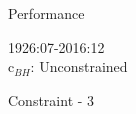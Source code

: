 \documentclass{beamer}
\begin{document}
\begin{frame}{Performance}
	\begin{center}
		1926:07-2016:12\\
		c$_{BH}$: Unconstrained
	\end{center}
	\vspace{-12pt}
	 \begin{adjustbox}{width=\textwidth}
	 	
	 \end{adjustbox}
	 \vspace{-12pt}
%	 	
	 \begin{center}
	 	Constraint - 3
	 \end{center}
	 \vspace{-6pt}
	 \begin{adjustbox}{max width=\textwidth}
	 	
	 \end{adjustbox}
\end{frame}

\end{document}
